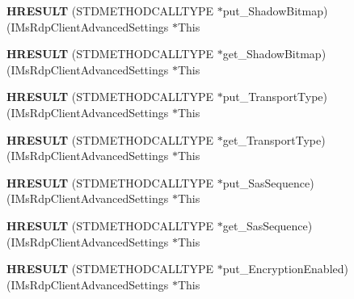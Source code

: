 \begin{DoxyCompactItemize}
\mbox{\label{struct_i_ms_rdp_client_advanced_settings_vtbl_a3f98b255988504e9006d17c945f70c1c}} 
{\bfseries H\+R\+E\+S\+U\+LT} (S\+T\+D\+M\+E\+T\+H\+O\+D\+C\+A\+L\+L\+T\+Y\+PE $\ast$put\+\_\+\+Shadow\+Bitmap)(I\+Ms\+Rdp\+Client\+Advanced\+Settings $\ast$This
\item 
\mbox{\label{struct_i_ms_rdp_client_advanced_settings_vtbl_ac759e65e211bbaf39efa8f05dd0ce300}} 
{\bfseries H\+R\+E\+S\+U\+LT} (S\+T\+D\+M\+E\+T\+H\+O\+D\+C\+A\+L\+L\+T\+Y\+PE $\ast$get\+\_\+\+Shadow\+Bitmap)(I\+Ms\+Rdp\+Client\+Advanced\+Settings $\ast$This
\item 
\mbox{\label{struct_i_ms_rdp_client_advanced_settings_vtbl_acbf1b671505759568642322a9f2ba35a}} 
{\bfseries H\+R\+E\+S\+U\+LT} (S\+T\+D\+M\+E\+T\+H\+O\+D\+C\+A\+L\+L\+T\+Y\+PE $\ast$put\+\_\+\+Transport\+Type)(I\+Ms\+Rdp\+Client\+Advanced\+Settings $\ast$This
\item 
\mbox{\label{struct_i_ms_rdp_client_advanced_settings_vtbl_af5ca2fb69ab9764b219dc7bef5b17769}} 
{\bfseries H\+R\+E\+S\+U\+LT} (S\+T\+D\+M\+E\+T\+H\+O\+D\+C\+A\+L\+L\+T\+Y\+PE $\ast$get\+\_\+\+Transport\+Type)(I\+Ms\+Rdp\+Client\+Advanced\+Settings $\ast$This
\item 
\mbox{\label{struct_i_ms_rdp_client_advanced_settings_vtbl_aa6f8acc22a4e5d00c4276af17b01daef}} 
{\bfseries H\+R\+E\+S\+U\+LT} (S\+T\+D\+M\+E\+T\+H\+O\+D\+C\+A\+L\+L\+T\+Y\+PE $\ast$put\+\_\+\+Sas\+Sequence)(I\+Ms\+Rdp\+Client\+Advanced\+Settings $\ast$This
\item 
\mbox{\label{struct_i_ms_rdp_client_advanced_settings_vtbl_a280876871370ef255fd936ca193d8dbb}} 
{\bfseries H\+R\+E\+S\+U\+LT} (S\+T\+D\+M\+E\+T\+H\+O\+D\+C\+A\+L\+L\+T\+Y\+PE $\ast$get\+\_\+\+Sas\+Sequence)(I\+Ms\+Rdp\+Client\+Advanced\+Settings $\ast$This
\item 
\mbox{\label{struct_i_ms_rdp_client_advanced_settings_vtbl_a20bfafdbdfad66a9b0c71624a82c37f3}} 
{\bfseries H\+R\+E\+S\+U\+LT} (S\+T\+D\+M\+E\+T\+H\+O\+D\+C\+A\+L\+L\+T\+Y\+PE $\ast$put\+\_\+\+Encryption\+Enabled)(I\+Ms\+Rdp\+Client\+Advanced\+Settings $\ast$This

\end{DoxyCompactItemize}
